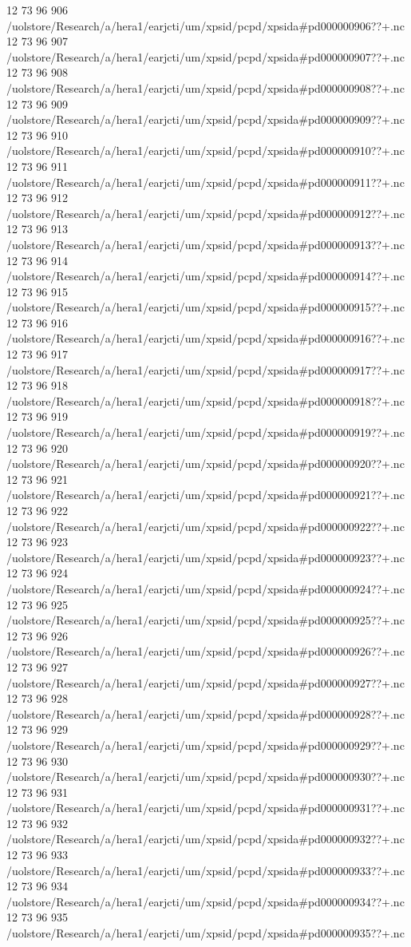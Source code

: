 12 73 96
906
/uolstore/Research/a/hera1/earjcti/um/xpsid/pcpd/xpsida#pd000000906??+.nc
12 73 96
907
/uolstore/Research/a/hera1/earjcti/um/xpsid/pcpd/xpsida#pd000000907??+.nc
12 73 96
908
/uolstore/Research/a/hera1/earjcti/um/xpsid/pcpd/xpsida#pd000000908??+.nc
12 73 96
909
/uolstore/Research/a/hera1/earjcti/um/xpsid/pcpd/xpsida#pd000000909??+.nc
12 73 96
910
/uolstore/Research/a/hera1/earjcti/um/xpsid/pcpd/xpsida#pd000000910??+.nc
12 73 96
911
/uolstore/Research/a/hera1/earjcti/um/xpsid/pcpd/xpsida#pd000000911??+.nc
12 73 96
912
/uolstore/Research/a/hera1/earjcti/um/xpsid/pcpd/xpsida#pd000000912??+.nc
12 73 96
913
/uolstore/Research/a/hera1/earjcti/um/xpsid/pcpd/xpsida#pd000000913??+.nc
12 73 96
914
/uolstore/Research/a/hera1/earjcti/um/xpsid/pcpd/xpsida#pd000000914??+.nc
12 73 96
915
/uolstore/Research/a/hera1/earjcti/um/xpsid/pcpd/xpsida#pd000000915??+.nc
12 73 96
916
/uolstore/Research/a/hera1/earjcti/um/xpsid/pcpd/xpsida#pd000000916??+.nc
12 73 96
917
/uolstore/Research/a/hera1/earjcti/um/xpsid/pcpd/xpsida#pd000000917??+.nc
12 73 96
918
/uolstore/Research/a/hera1/earjcti/um/xpsid/pcpd/xpsida#pd000000918??+.nc
12 73 96
919
/uolstore/Research/a/hera1/earjcti/um/xpsid/pcpd/xpsida#pd000000919??+.nc
12 73 96
920
/uolstore/Research/a/hera1/earjcti/um/xpsid/pcpd/xpsida#pd000000920??+.nc
12 73 96
921
/uolstore/Research/a/hera1/earjcti/um/xpsid/pcpd/xpsida#pd000000921??+.nc
12 73 96
922
/uolstore/Research/a/hera1/earjcti/um/xpsid/pcpd/xpsida#pd000000922??+.nc
12 73 96
923
/uolstore/Research/a/hera1/earjcti/um/xpsid/pcpd/xpsida#pd000000923??+.nc
12 73 96
924
/uolstore/Research/a/hera1/earjcti/um/xpsid/pcpd/xpsida#pd000000924??+.nc
12 73 96
925
/uolstore/Research/a/hera1/earjcti/um/xpsid/pcpd/xpsida#pd000000925??+.nc
12 73 96
926
/uolstore/Research/a/hera1/earjcti/um/xpsid/pcpd/xpsida#pd000000926??+.nc
12 73 96
927
/uolstore/Research/a/hera1/earjcti/um/xpsid/pcpd/xpsida#pd000000927??+.nc
12 73 96
928
/uolstore/Research/a/hera1/earjcti/um/xpsid/pcpd/xpsida#pd000000928??+.nc
12 73 96
929
/uolstore/Research/a/hera1/earjcti/um/xpsid/pcpd/xpsida#pd000000929??+.nc
12 73 96
930
/uolstore/Research/a/hera1/earjcti/um/xpsid/pcpd/xpsida#pd000000930??+.nc
12 73 96
931
/uolstore/Research/a/hera1/earjcti/um/xpsid/pcpd/xpsida#pd000000931??+.nc
12 73 96
932
/uolstore/Research/a/hera1/earjcti/um/xpsid/pcpd/xpsida#pd000000932??+.nc
12 73 96
933
/uolstore/Research/a/hera1/earjcti/um/xpsid/pcpd/xpsida#pd000000933??+.nc
12 73 96
934
/uolstore/Research/a/hera1/earjcti/um/xpsid/pcpd/xpsida#pd000000934??+.nc
12 73 96
935
/uolstore/Research/a/hera1/earjcti/um/xpsid/pcpd/xpsida#pd000000935??+.nc
